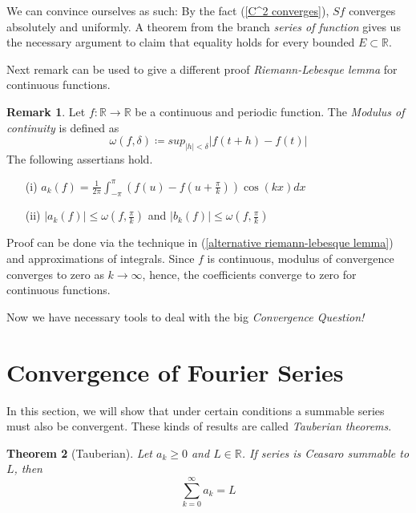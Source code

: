 \documentclass[12pt]{amsart}
\newtheorem{theorem}{Theorem}[section]
\theoremstyle{definition}
\newtheorem{remark}[theorem]{Remark}
\newcommand{\RR}{{\mathbb R}} %
\begin{document}
    We can convince ourselves as such: By the fact (\ref{C^2 converges}), $Sf$ converges absolutely and uniformly. A theorem\footnotemark{}
    from the branch \emph{series of function} gives us the necessary argument to claim that equality holds for every bounded $E \subset \RR$.




Next remark can be used to give a different proof \emph{Riemann-Lebesque lemma} for continuous functions.


\begin{remark}
    Let $f: \RR \to \RR$ be a continuous and periodic function. The \emph{Modulus of continuity} is defined as
    \[
    \omega(f, \delta) \coloneqq sup_{|h| < \delta}|f(t+h) - f(t)|
    \] The following assertians hold.
    \begin{itemize}
        \item[(i)] $a_k(f) = \frac{1}{2\pi}  \int_{-\pi}^{\pi} (f(u) - f(u + \frac{\pi}{k}))\cos(kx)dx$
        \item[(ii)] $|a_k(f)| \leq \omega(f, \frac{\pi}{k})$ and $|b_k(f)| \leq \omega(f, \frac{\pi}{k})$
    \end{itemize}
\end{remark}


Proof can be done via the technique in (\ref{alternative riemann-lebesque lemma}) and approximations of integrals. Since $f$ is continuous, modulus of convergence converges to zero as $k \to \infty$, hence, the coefficients converge to zero for continuous functions.


\par Now we have necessary tools to deal with the big \emph{Convergence Question!}



\section{Convergence of Fourier Series}


In this section, we will show that under certain conditions a summable series must also be convergent. These kinds of results are called \emph{Tauberian theorems}.


\begin{theorem}[Tauberian]
    Let $a_k \geq 0$ and $L \in \RR$. If series is Ceasaro summable to $L$, then
    \[
    \sum_{k=0}^{\infty} a_k = L
    \]
\end{theorem}
\end{document}

